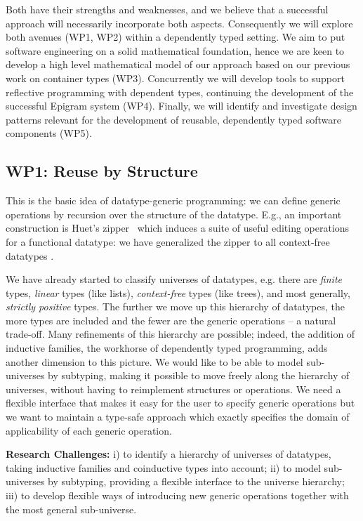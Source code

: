 \documentclass[a4paper]{article}
\begin{document}
Both have their
strengths and
weaknesses, and we believe that a successful approach will necessarily
incorporate both aspects. Consequently we will explore both avenues
(WP1, WP2) within a dependently typed setting. We aim to put software
engineering on a solid mathematical foundation, hence we are keen to
develop a high level mathematical model of our approach based on our
previous work on container types (WP3). Concurrently we will develop
tools to support reflective programming with dependent types,
continuing the development of the successful Epigram system
(WP4). Finally, we will identify and investigate design patterns
relevant for the development of reusable, dependently typed software
components (WP5).


\subsection*{WP1: Reuse by Structure}
\label{sec:reuse-structure}

This is the basic idea of datatype-generic programming: we can define
generic operations by recursion over the structure of the
datatype. E.g., an important construction is Huet's
zipper~\cite{huet:zipper} which induces a suite of useful editing
operations for a functional datatype: we have generalized the zipper
to all context-free datatypes \cite{alti:regular,txa:ssgp06}.

We have already started to classify universes of datatypes, e.g. there
are \emph{finite} types, \emph{linear} types (like lists),
\emph{context-free} types (like trees), and most generally,
\emph{strictly positive} types.  The further we move up this hierarchy
of datatypes, the more types are included and the fewer are the
generic operations -- a natural trade-off. Many refinements of this
hierarchy are possible; indeed, the addition of inductive families,
the workhorse of dependently typed programming, adds another dimension
to this picture. We would like to be able to model sub-universes by
subtyping, making it possible to move freely along the hierarchy of
universes, without having to reimplement structures or operations. We
need a flexible interface that makes it easy for the user to specify
generic operations but we want to maintain a type-safe approach which
exactly specifies the domain of applicability of each generic
operation.

\textbf{Research Challenges:} i) to identify a hierarchy of universes of
datatypes, taking inductive families and coinductive types into
account; ii) to model sub-universes by subtyping, providing a flexible
interface to the universe hierarchy; iii) to develop flexible ways of
introducing new generic operations together with the most general
sub-universe.
\end{document}
